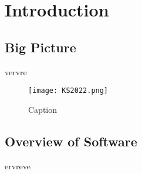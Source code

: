 \chapter{Introduction}

\section{Big Picture}
vervre

\begin{figure}[h]
    \centering
    \texttt{[image: KS2022.png]}
    \caption{Caption}
    \label{fig:graphicalabstract}
\end{figure}

\cite{Krajewski2024Nimplex}

\section{Overview of Software}

ervreve